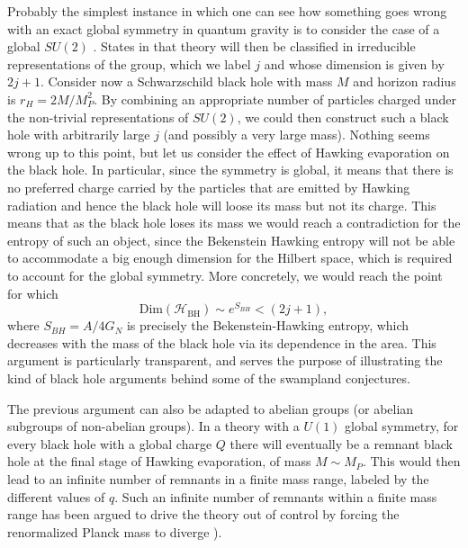 \documentclass[11pt,a4paper]{article}
\begin{document}
Probably the simplest instance in which one can see how something goes wrong with an exact global symmetry in quantum gravity is to consider the case of a global $SU(2)$ \cite{OoguriCERN}. States in that theory will then be classified in irreducible representations of the group, which we label $j$ and whose dimension is given by $2j+1$.  Consider now a Schwarzschild black hole with mass $M$ and  horizon radius is $r_H=2 M/M_P^2$. By combining an appropriate number of particles charged under the non-trivial representations of $SU(2)$, we could then construct such a black hole with arbitrarily large $j$ (and possibly a very large mass). Nothing seems wrong up to this point, but let us consider the effect of Hawking evaporation on the black hole. In particular, since the symmetry is global, it means that there is no preferred charge carried by the particles that are emitted by Hawking radiation and hence the black hole will loose its mass but not its charge. This means that as the black hole loses its mass we would reach a contradiction for the entropy of such an object, since the Bekenstein Hawking entropy will not be able to accommodate a big enough dimension for the Hilbert space, which is required to account for the global symmetry. More concretely, we would reach the point for which
\begin{equation}
\mathrm{Dim}(\mathcal{H}_{\mathrm{BH}})\sim e^{S_{BH}} < (2j+1), 
\end{equation}
where $S_{BH}=A/4G_N$ is precisely the Bekenstein-Hawking entropy, which decreases with the mass of the black hole via its dependence in the area. This argument is particularly transparent, and serves the purpose of illustrating the kind of black hole arguments behind some of the swampland conjectures. 

The previous argument can also be adapted to abelian groups (or abelian subgroups of non-abelian groups). In a theory with a $U(1)$ global symmetry, for every black hole with a global charge $Q$ there will eventually be a remnant black hole at the final stage of Hawking evaporation, of mass $M \sim M_P$. This would then lead to an infinite number of remnants in a finite mass range, labeled by the different values of $q$. Such an infinite number of remnants within a finite mass range has been argued to drive the theory out of control by forcing the renormalized Planck mass to diverge \cite{Susskind:1995da}). 
\end{document}
